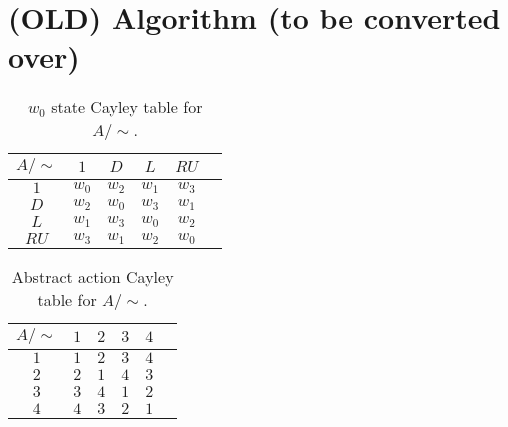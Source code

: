 \chapter{(OLD) Algorithm (to be converted over)}

\begin{table}
    \centering
    \begin{tabular}{c|c c c c c}
        $A/\sim$    &  $1$      & $D$       & $L$       & $RU$\\
         \hline
        $1$         & $w_{0}$   & $w_{2}$   & $w_{1}$   & $w_{3}$\\
        $D$         & $w_{2}$   & $w_{0}$   & $w_{3}$   & $w_{1}$\\
        $L$         & $w_{1}$   & $w_{3}$   & $w_{0}$   & $w_{2}$\\
        $RU$        & $w_{3}$   & $w_{1}$   & $w_{2}$   & $w_{0}$\\
    \end{tabular}
    \caption{$w_{0}$ state Cayley table for $A/\sim$.}
\end{table}

\begin{table}[H]
    \centering
    \begin{tabular}{c|c c c c c}
        $A/\sim$    &  $1$      & $2$       & $3$       & $4$\\
        \hline
        $1$         & $1$       & $2$       & $3$       & $4$\\
        $2$         & $2$       & $1$       & $4$      & $3$\\
        $3$         & $3$       & $4$      & $1$       & $2$\\
        $4$        & $4$      & $3$       & $2$       & $1$\\
    \end{tabular}
    \caption{Abstract action Cayley table for $A/\sim$.}
\end{table}